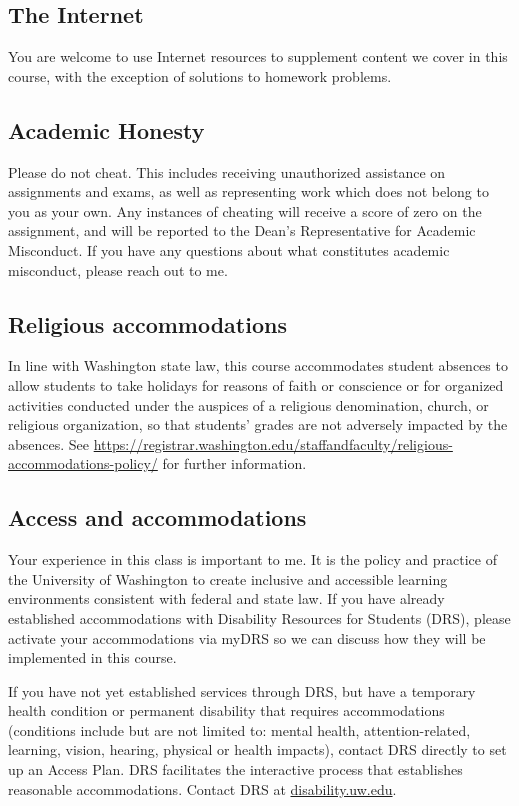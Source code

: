 \documentclass[11pt,twoside]{amsart}
\begin{document}
\subsection*{The Internet}
You are welcome to use Internet resources to supplement content we cover in this course, with the exception of solutions to homework problems.

\subsection*{Academic Honesty}
Please do not cheat. This includes receiving unauthorized assistance on assignments and exams, as well as representing work which does not belong to you as your own. Any instances of cheating will receive a score of zero on the assignment, and will be reported to the Dean’s Representative for Academic Misconduct. If you have any questions about what constitutes academic misconduct, please reach out to me.

\subsection*{Religious accommodations}
In line with Washington state law, this course accommodates student absences to allow students to take holidays for reasons of faith or conscience or for organized activities conducted under the auspices of a religious denomination, church, or religious organization, so that students’ grades are not adversely impacted by the absences. See \url{https://registrar.washington.edu/staffandfaculty/religious-accommodations-policy/} for further information.

\subsection*{Access and accommodations}
Your experience in this class is important to me. It is the policy and practice of the University of Washington to create inclusive and accessible learning environments consistent with federal and state law. If you have already established accommodations with Disability Resources for Students (DRS), please activate your accommodations via myDRS so we can discuss how they will be implemented in this course.

If you have not yet established services through DRS, but have a temporary health condition or permanent disability that requires accommodations (conditions include but are not limited to: mental health, attention-related, learning, vision, hearing, physical or health impacts), contact DRS directly to set up an Access Plan. DRS facilitates the interactive process that establishes reasonable accommodations. Contact DRS at \url{disability.uw.edu}.
\end{document}
